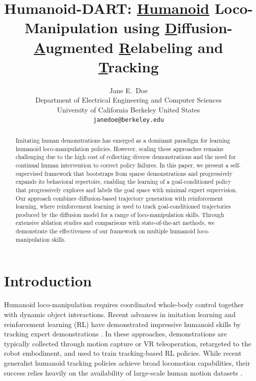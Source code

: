 \documentclass{article}
\title{Humanoid-DART: \underline{Humanoid} Loco-Manipulation using \underline{D}iffusion-\underline{A}ugmented \underline{R}elabeling and \underline{T}racking }
\author{
  Jane E.~Doe\\
  Department of Electrical Engineering and Computer Sciences\\
  University of California Berkeley 
  United States\\
  \texttt{janedoe@berkeley.edu} \\
}
\begin{document}
\maketitle


\begin{abstract}
    Imitating human demonstrations has emerged as a dominant paradigm for learning humanoid loco-manipulation policies. However, scaling these approaches remains challenging due to the high cost of collecting diverse demonstrations and the need for continual human intervention to correct policy failures. In this paper, we present a self-supervised framework that bootstraps from sparse demonstrations and progressively expands its behavioral repertoire, enabling the learning of a goal-conditioned policy that progressively explores and labels the goal space with minimal expert supervision. Our approach combines diffusion-based trajectory generation with reinforcement learning, where reinforcement learning is used to track goal-conditioned trajectories produced by the diffusion model for a range of loco-manipulation skills. Through extensive ablation studies and comparisons with state-of-the-art methods, we demonstrate the effectiveness of our framework on multiple humanoid loco-manipulation skills. 
\end{abstract}



\section{Introduction}
Humanoid loco-manipulation requires coordinated whole-body control together with dynamic object interactions. Recent advances in imitation learning and reinforcement learning (RL) have demonstrated impressive humanoid skills by tracking expert demonstrations \cite{he2024omnih2ouniversaldexteroushumantohumanoid, he2024learning, li2025cloneclosedloopwholebodyhumanoid, liao2025beyondmimicmotiontrackingversatile}. In these approaches, demonstrations are typically collected through motion capture or VR teleoperation, retargeted to the robot embodiment, and used to train tracking-based RL policies. While recent generalist humanoid tracking policies \cite{yin2025unitrackerlearninguniversalwholebody, li2026omnitrackgeneralmotiontracking, luo2026sonicsupersizingmotiontracking} achieve broad locomotion capabilities, their success relies heavily on the availability of large-scale human motion datasets \cite{AMASS:ICCV:2019}.
\end{document}
